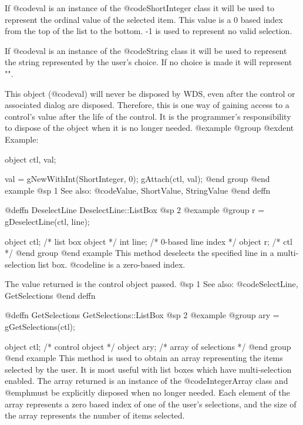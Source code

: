 {If @code{val} is an instance of the @code{ShortInteger} class it will
be used to represent the ordinal value of the selected item.  This value
is a 0 based index from the top of the list to the bottom.  -1 is used
to represent no valid selection.

If @code{val} is an instance of the @code{String} class it will be used
to represent the string represented by the user's choice.  If no choice is
made it will represent "".

This object (@code{val}) will never be disposed by WDS, even after
the control or associated dialog are disposed.  Therefore, this
is one way of gaining access to a control's value after the life
of the control.  It is the programmer's responsibility to dispose of
the object when it is no longer needed.
@example
@group
@exdent Example:

object  ctl, val;

val = gNewWithInt(ShortInteger, 0);
gAttach(ctl, val);
@end group
@end example
@sp 1
See also:  @code{Value, ShortValue, StringValue}
@end deffn



@deffn {DeselectLine} DeselectLine::ListBox
@sp 2
@example
@group
r = gDeselectLine(ctl, line);

object  ctl;    /*  list box object  */
int     line;   /*  0-based line index  */
object  r;      /*  ctl              */
@end group
@end example
This method deselects the specified line in a multi-selection list box.
@code{line} is a zero-based index.

The value returned is the control object passed.
@sp 1
See also:  @code{SelectLine, GetSelections}
@end deffn
















@deffn {GetSelections} GetSelections::ListBox
@sp 2
@example
@group
ary = gGetSelections(ctl);

object  ctl;   /*  control object       */
object  ary;   /*  array of selections  */
@end group
@end example
This method is used to obtain an array representing the items selected
by the user.  It is most useful with list boxes which have multi-selection
enabled.  The array returned is an instance of the @code{IntegerArray} class
and @emph{must} be explicitly disposed when no longer needed.  Each element
of the array represents a zero based index of one of the user's selections,
and the size of the array represents the number of items selected.

}

